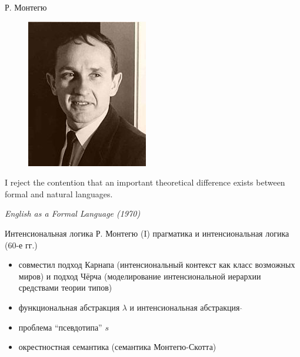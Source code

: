 \documentclass{beamer}
\begin{document}
\begin{frame}{Р. Монтегю}
\begin{center}
	\begin{figure}[H]
		\includegraphics[scale=0.5]{montague.jpg} 
	\end{figure}
\end{center}
\begin{flushleft}
I reject the contention that an important theoretical difference exists between formal and natural languages.
\end{flushleft}
\begin{flushright}
\textit{English as a Formal Language (1970)}
\end{flushright}
\end{frame}

\begin{frame}{Интенсиональная логика Р. Монтегю (I)}
прагматика и интенсиональная логика (60-е гг.)\\
\bigskip
\begin{itemize}
    \item совместил подход Карнапа (интенсиональный контекст как класс возможных миров) и подход Чёрча (моделирование интенсиональной иерархии средствами теории типов)
    \item функциональная абстракция $\lambda$ и интенсиональная абстракция $\hat{}$
    \item проблема ``псевдотипа'' $s$
    \item окрестностная семантика (семантика Монтегю-Скотта)
\end{itemize}
\end{frame}
\end{document}
